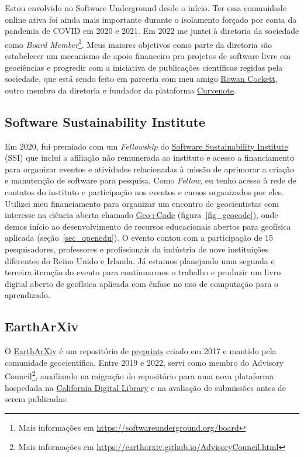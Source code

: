 \documentclass[12pt,a4paper,oneside]{book}
\begin{document}
Estou envolvido no Software Underground desde o início.
Ter essa comunidade online ativa foi ainda mais importante durante o isolamento
forçado por conta da pandemia de COVID em 2020 e 2021.
Em 2022 me juntei à diretoria da sociedade como
\textit{Board Member}\footnote{Mais informações em \url{https://softwareunderground.org/board}}.
Meus maiores objetivos como parte da diretoria são estabelecer um mecanismo de
apoio financeiro pra projetos de software livre em geociências e progredir com
a iniciativa de publicações científicas regidas pela sociedade, que está sendo
feito em parceria com meu amigo \href{https://row1.ca/}{Rowan Cockett}, outro
membro da diretoria e fundador da plataforma \href{https://curvenote.com/}{Curvenote}.

\subsection{Software Sustainability Institute}
\label{sec_ssi}

Em 2020, fui premiado com um \textit{Fellowship} do
\href{https://software.ac.uk/}{Software Sustainability Institute} (SSI) que
inclui a afiliação não remunerada ao instituto e acesso a financiamento para
organizar eventos e atividades relacionadas à missão de aprimorar a criação e
manutenção de software para pesquisa.
Como \textit{Fellow}, eu tenho acesso à rede de contatos do instituto e
participação nos eventos e cursos organizados por eles.
Utilizei meu financiamento para organizar um encontro de geocientistas com
interesse na ciência aberta chamado
\href{https://hackmd.io/@leouieda/uk-geo-code-meetup}{Geo+Code}
(figura~\ref{fig_geocode}),
onde demos início ao desenvolvimento de recursos educacionais abertos para
geofísica aplicada (seção~\ref{sec_openedu}).
O evento contou com a participação de 15 pesquisadores, professores e
profissionais da indústria de nove instituições diferentes do Reino Unido e
Irlanda.
Já estamos planejando uma segunda e terceira iteração do evento para
continuarmos o trabalho e produzir um livro digital aberto de geofísica
aplicada com ênfase no uso de computação para o aprendizado.

\subsection{EarthArXiv}

O \href{https://eartharxiv.org/}{EarthArXiv} é um repositório de
\href{https://en.wikipedia.org/wiki/Preprint}{preprints} criado em 2017 e
mantido pela comunidade geocientífica.
Entre 2019 e 2022, servi como membro do
Advisory Council\footnote{Mais informações em \url{https://eartharxiv.github.io/AdvisoryCouncil.html}},
auxiliando na migração do repositório para uma nova plataforma hospedada na
\href{https://cdlib.org/}{California Digital Library} e na avaliação de
submissões antes de serem publicadas.
\end{document}
